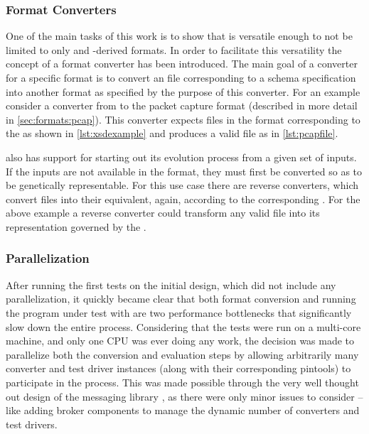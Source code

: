 \subsubsection{Format Converters}
One of the main tasks of this work is to show that \xmlmate is versatile enough to not be limited to 
only \xml and \xml-derived formats. In order to facilitate this versatility the concept of a format 
converter has been introduced. The main goal of a converter for a specific format is to convert an 
\xml file corresponding to a schema specification into another format as specified by the purpose 
of this converter. For an example consider a converter from \xml to the packet capture format \pcap
(described in more detail in \cref{sec:formats:pcap}).
This converter expects \xml files in the format corresponding to the \pcap{} \xsd as shown in
\cref{lst:xsdexample} and produces a valid \pcap file as in \cref{lst:pcapfile}.

\xmlmate also has support for starting out its evolution process from a given set of inputs. If the   
inputs are not available in the \xml format, they must first be converted so as to be genetically 
representable. For this use case there are reverse converters, which convert files into their 
\xml equivalent, again, according to the corresponding \xsd. For the above example a reverse converter 
could transform any valid \pcap file into its \xml representation governed by the \pcap{} \xsd.
\subsubsection{Parallelization}
\label{sec:par}
After running the first tests on the initial \xmlmate design, which did not include any parallelization, 
it quickly became clear that both format conversion and running the program under test with \pin 
are two performance bottlenecks that significantly slow down the entire process. Considering that the 
tests were run on a multi-core machine, and only one CPU was ever doing any work, the decision was 
made to parallelize both the conversion and evaluation steps by allowing arbitrarily many 
converter and test driver instances (along with their corresponding pintools) to participate in the process. 
This was made possible through the very well thought out design of the messaging library \zmq, 
as there were only minor issues to consider -- like adding broker components to manage the dynamic number of
converters and test drivers.

